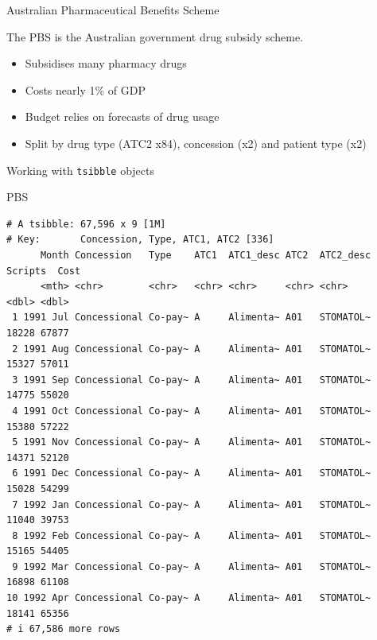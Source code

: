 \documentclass[
  14pt,
  ignorenonframetext,
  aspectratio=169,
]{beamer}
\newenvironment{Shaded}{\begin{snugshade}}{\end{snugshade}}
\newcommand{\NormalTok}[1]{#1}
\providecommand{\tightlist}{%
  \setlength{\itemsep}{0pt}\setlength{\parskip}{0pt}}
\renewenvironment{Shaded}{\vspace*{0.15cm}\color{black}\fontsize{10}{10}\sf\begin{snugshade}\color{black}}{\end{snugshade}}
\begin{document}
\begin{frame}{Australian Pharmaceutical Benefits Scheme}
\protect{}\label{australian-pharmaceutical-benefits-scheme-1}
\begin{block}{}
The \alert{PBS} is the Australian government drug subsidy scheme.
\end{block}
\pause\fontsize{13.3}{15}\sf

\begin{itemize}
\tightlist
\item
  Subsidises many pharmacy drugs
\item
  Costs nearly 1\% of GDP
\item
  Budget relies on forecasts of drug usage
\item
  Split by drug type (ATC2 x84), concession (x2) and patient type (x2)
\end{itemize}
\end{frame}

\begin{frame}[fragile]{Working with \texttt{tsibble} objects}
\protect{}\label{working-with-tsibble-objects}
\fontsize{8}{10}\sf

\begin{Shaded}
\begin{Highlighting}[]
\NormalTok{PBS}
\end{Highlighting}
\end{Shaded}

\begin{verbatim}
# A tsibble: 67,596 x 9 [1M]
# Key:       Concession, Type, ATC1, ATC2 [336]
      Month Concession   Type    ATC1  ATC1_desc ATC2  ATC2_desc Scripts  Cost
      <mth> <chr>        <chr>   <chr> <chr>     <chr> <chr>       <dbl> <dbl>
 1 1991 Jul Concessional Co-pay~ A     Alimenta~ A01   STOMATOL~   18228 67877
 2 1991 Aug Concessional Co-pay~ A     Alimenta~ A01   STOMATOL~   15327 57011
 3 1991 Sep Concessional Co-pay~ A     Alimenta~ A01   STOMATOL~   14775 55020
 4 1991 Oct Concessional Co-pay~ A     Alimenta~ A01   STOMATOL~   15380 57222
 5 1991 Nov Concessional Co-pay~ A     Alimenta~ A01   STOMATOL~   14371 52120
 6 1991 Dec Concessional Co-pay~ A     Alimenta~ A01   STOMATOL~   15028 54299
 7 1992 Jan Concessional Co-pay~ A     Alimenta~ A01   STOMATOL~   11040 39753
 8 1992 Feb Concessional Co-pay~ A     Alimenta~ A01   STOMATOL~   15165 54405
 9 1992 Mar Concessional Co-pay~ A     Alimenta~ A01   STOMATOL~   16898 61108
10 1992 Apr Concessional Co-pay~ A     Alimenta~ A01   STOMATOL~   18141 65356
# i 67,586 more rows
\end{verbatim}
\end{frame}
\end{document}
